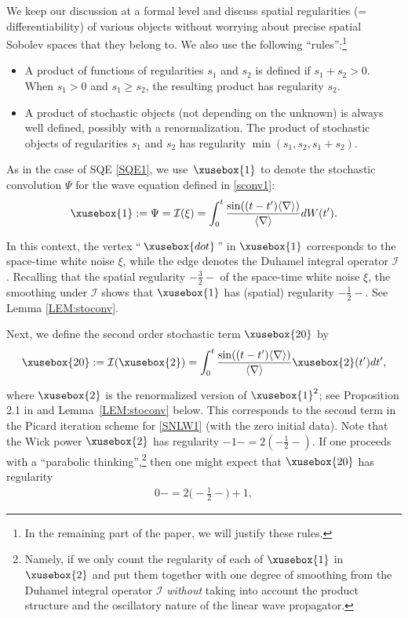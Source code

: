 \documentclass[%
11pt,  reqno]{amsart}
\def\<#1>{\xusebox{#1}}
\newcommand{\1}{\hspace{0.2mm}\text{I}\hspace{0.2mm}}
\newcommand{\noi}{\noindent}
\newcommand{\nb}{\nabla}
\newcommand{\jb}[1]
{\langle #1 \rangle}
\newcommand{\I}{\mathcal{I}}
\numberwithin{equation}{section}
\numberwithin{theorem}{section}
\begin{document}
We keep our discussion 
at a formal level
and discuss spatial regularities (= differentiability) of various objects
without worrying about precise spatial Sobolev spaces that they belong to.
We also use the following ``rules'':\footnote{In the remaining part of the paper, 
we will justify these rules.}


\begin{itemize}

\item A product of functions of regularities $s_1$ and $s_2$
is defined if $s_1 + s_2 > 0$.
When $s_1 > 0$ and $s_1 \geq s_2$, the resulting product has regularity $s_2$.

\item A product of stochastic objects (not depending on the unknown)
is always well defined, possibly with a renormalization.
The product of stochastic objects of regularities $s_1$ and $s_2$
has regularity $\min( s_1, s_2, s_1 + s_2)$.

\end{itemize}


As in the case of  SQE \eqref{SQE1}, 
 we use~$\<1>$
to denote the stochastic convolution $\Psi$ for the wave equation defined in \eqref{sconv1}:
\begin{align}
 \<1> : = 
 \Psi = \I  (\xi)
  =  \int_{0}^t \frac{\sin ((t-t')\jb{\nb})}{\jb{\nb}}dW(t').
\label{so3}
\end{align}




\noi
In this context, 
the vertex ``\,$\<dot>$\,'' in $\<1>$ corresponds to the space-time white noise $\xi$,
while the edge denotes the Duhamel integral operator $\I$.
Recalling that the spatial regularity $-\frac 32 -$ of the space-time white noise $\xi$, 
the smoothing under $\I$ 
shows that 
 $\<1>$ has (spatial) regularity $- \frac 12-$.  See Lemma \ref{LEM:stoconv}.

Next, we define the second order stochastic term $\<20>$ by 
\begin{align}
  \<20> := 
   \I (\<2>)
  =  \int_{0}^t \frac{\sin ((t-t')\jb{\nb})}{\jb{\nb}}\<2>(t') dt', 
\label{so4}
\end{align}

\noi
where $\<2>$ is the renormalized version of $\<1>^2$;
see Proposition 2.1 in \cite{GKO}
and Lemma~\ref{LEM:stoconv} below.
This corresponds to the second term in the Picard iteration scheme for \eqref{SNLW1}
(with the zero initial data).
Note that the Wick power $\<2>$ has regularity $-1- = 2(-\frac{1}{2}-)$.
If one proceeds with a ``parabolic thinking'',\footnote{Namely, 
if we only count the regularity of each of $\<1>$ in $\<2>$
and put them together with one degree of smoothing
from the Duhamel integral operator $\I$ {\it without} taking into account the product structure
and the oscillatory nature of the linear wave propagator.}
then one might expect that $\<20>$ has
regularity 
\begin{align}
0- = 2\big(-\tfrac 12 -\big) + 1,
\label{naive1}
\end{align}
\end{document}
